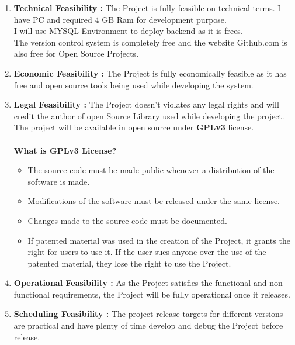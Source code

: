 \begin{enumerate}
	\item \textbf{Technical Feasibility :} The Project is fully feasible on technical terms. I have PC and required 4 GB Ram for development purpose.\\
	I will use MYSQL Environment to deploy backend as it is frees.\\
	The version control system is completely free and the website Github.com is also free for Open Source Projects.
   \item \textbf{Economic Feasibility :} The Project is fully economically feasible as it has free and open source tools being used while developing the system.\\
   \item \textbf{Legal Feasibility :} The Project doesn't violates any legal rights and will credit the author of open Source Library used while developing the project.\\
   The project will be available in open source under \textbf{GPLv3} license.\\
   \\
   \textbf{What is GPLv3 License?}
   \begin{itemize}
   	\item The source code must be made public whenever a distribution of the software is made.
   	\item Modifications of the software must be released under the same license.
   	\item Changes made to the source code must be documented.
   	\item If patented material was used in the creation of the Project, it grants the right for users to use it. If the user sues anyone over the use of the patented material, they lose the right to use the Project.\\
   \end{itemize}
 
   \item \textbf{Operational Feasibility : } As the Project satisfies the functional and non functional requirements, the Project will be fully operational once it releases.
   
   \item \textbf{Scheduling Feasibility : } The project release targets for different versions are practical and have plenty of time develop and debug the Project before release.
\end{enumerate}

